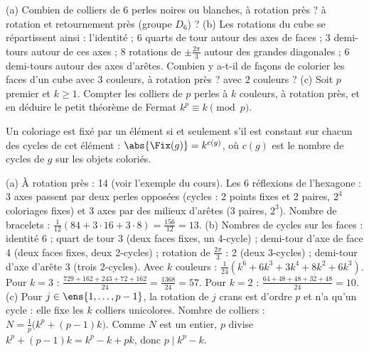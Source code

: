\begin{exo}
(a) Combien de colliers de 6 perles noires ou blanches, à rotation près ? à rotation et retournement près (groupe $D_6$) ? (b) Les rotations du cube se répartissent ainsi : l'identité ; 6 quarts de tour autour des axes de faces ; 3 demi-tours autour de ces axes ; 8 rotations de $\pm\frac{2\pi}3$ autour des grandes diagonales ; 6 demi-tours autour des axes d'arêtes. Combien y a-t-il de façons de colorier les faces d'un cube avec $3$ couleurs, à rotation près ? avec $2$ couleurs ? (c) Soit $p$ premier et $k\ge1$. Compter les colliers de $p$ perles à $k$ couleurs, à rotation près, et en déduire le petit théorème de Fermat $k^p\equiv k\pmod p$.
\begin{indication}
Un coloriage est fixé par un élément si et seulement s'il est constant sur chacun des cycles de cet élément : $\abs{\Fix(g)}=k^{c(g)}$, où $c(g)$ est le nombre de cycles de $g$ sur les objets coloriés.
\end{indication}
\begin{corrige}
(a) À rotation près : 14 (voir l'exemple du cours). Les 6 réflexions de l'hexagone : 3 axes passent par deux perles opposées (cycles : 2 points fixes et 2 paires, $2^4$ coloriages fixes) et 3 axes par des milieux d'arêtes (3 paires, $2^3$). Nombre de bracelets : $\frac1{12}(84+3\cdot16+3\cdot8)=\frac{156}{12}=13$.
(b) Nombres de cycles sur les faces : identité 6 ; quart de tour 3 (deux faces fixes, un 4-cycle) ; demi-tour d'axe de face 4 (deux faces fixes, deux 2-cycles) ; rotation de $\frac{2\pi}3$ : 2 (deux 3-cycles) ; demi-tour d'axe d'arête 3 (trois 2-cycles). Avec $k$ couleurs : $\frac1{24}(k^6+6k^3+3k^4+8k^2+6k^3)$. Pour $k=3$ : $\frac{729+162+243+72+162}{24}=\frac{1368}{24}=57$. Pour $k=2$ : $\frac{64+48+48+32+48}{24}=10$.
(c) Pour $j\in\ens{1,\dots,p-1}$, la rotation de $j$ crans est d'ordre $p$ et n'a qu'un cycle : elle fixe les $k$ colliers unicolores. Nombre de colliers : $N=\frac1p\big(k^p+(p-1)k\big)$. Comme $N$ est un entier, $p$ divise $k^p+(p-1)k=k^p-k+pk$, donc $p\mid k^p-k$.
\end{corrige}
\end{exo}

